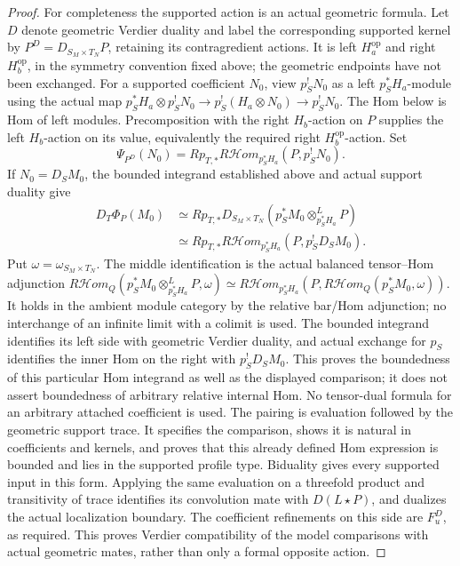 \documentclass[11pt]{article}
\theoremstyle{definition}
\theoremstyle{remark}
\begin{document}
\begin{proof}
For completeness the supported action is an actual geometric formula.
Let $D$ denote geometric Verdier duality and label the corresponding
supported kernel by $P^D=D_{S_M\times T_N}P$, retaining its
contragredient actions. It is left $H_a^{\mathrm{op}}$ and right
$H_b^{\mathrm{op}}$, in the symmetry convention fixed above; the
geometric endpoints have not been exchanged. For a supported
coefficient $N_0$, view $p_S^!N_0$ as a left $p_S^*H_a$-module
using the actual map
$p_S^*H_a\otimes p_S^!N_0\to p_S^!(H_a\otimes N_0)\to p_S^!N_0$.
The Hom below is Hom of left modules. Precomposition with the
right $H_b$-action on $P$ supplies the left $H_b$-action on its
value, equivalently the required right $H_b^{\mathrm{op}}$-action.
Set
\[
 \Psi_{P^D}(N_0)=Rp_{T,*}
    R\mathcal Hom_{p_S^*H_a}(P,p_S^!N_0).
\]
If $N_0=D_SM_0$, the bounded integrand established above and actual
support duality give
\[
 \begin{aligned}
 D_T\Phi_P(M_0)
 &\simeq Rp_{T,*}D_{S_M\times T_N}
                 (p_S^*M_0\otimes^L_{p_S^*H_a}P)\\
 &\simeq Rp_{T,*}R\mathcal Hom_{p_S^*H_a}
                 (P,p_S^!D_SM_0).
 \end{aligned}
\]
Put $\omega=\omega_{S_M\times T_N}$. The middle identification
is the actual balanced tensor--Hom adjunction
$R\mathcal Hom_Q(p_S^*M_0\otimes_{p_S^*H_a}^LP,\omega)
\simeq R\mathcal Hom_{p_S^*H_a}(P,
R\mathcal Hom_Q(p_S^*M_0,\omega))$.
It holds in the ambient module category by the relative bar/Hom
adjunction; no interchange of an infinite limit with a colimit is
used. The bounded integrand identifies its left side with geometric
Verdier duality, and actual exchange for $p_S$ identifies the inner
Hom on the right with $p_S^!D_SM_0$. This proves the boundedness of
this particular Hom integrand as well as the displayed comparison;
it does not assert boundedness of arbitrary relative internal Hom.
No tensor-dual formula for an arbitrary attached coefficient is used.  The pairing
is evaluation followed by the geometric support trace.  It specifies
the comparison, shows it is natural in coefficients and kernels,
and proves that this already defined Hom expression is bounded and
lies in the supported profile type.  Biduality gives every supported
input in this form.  Applying the same evaluation on a threefold
product and transitivity of trace identifies its convolution mate
with $D(L\star P)$, and dualizes the actual localization boundary.
The coefficient refinements on this side are $F_u^D$, as required.
This proves Verdier compatibility of the model comparisons with
actual geometric mates, rather than only a formal opposite action.
\end{proof}
\end{document}
